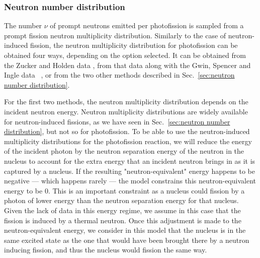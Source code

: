 \subsubsection*{Neutron number distribution}\label{sec:neutron number distribution for photofission}
The number $\nu$ of prompt neutrons emitted per photofission 
is sampled from a prompt fission neutron multiplicity distribution. 
Similarly to the case of neutron-induced fission, the neutron 
multiplicity distribution for photofission can be obtained four 
ways, depending on the option selected. It can be obtained from the
Zucker and Holden data \cite{Zucker and Holden 1986}
, from that data along with the 
Gwin, Spencer and Ingle data~\cite{Gwin 1984}
, or from the two other methods 
 described in 
Sec.~\ref{sec:neutron number distribution}.

For the first two methods, 
the neutron multiplicity distribution
depends on the incident neutron energy. Neutron multiplicity
distributions are widely available for neutron-induced fissions,
as we have seen in Sec.~\ref{sec:neutron number distribution}, but
not so for photofission. To be able to use the neutron-induced 
multiplicity distributions for the photofission reaction, we will 
reduce the energy of the incident photon by the neutron separation 
energy of the neutron in the nucleus to account for the extra 
energy that an incident neutron brings in as it is captured by a 
nucleus. If the resulting "neutron-equivalent" energy happens to 
be negative --- which happens rarely --- the model constrains this
neutron-equivalent energy to be 0. 
This is an important constraint as a nucleus could fission by a 
photon of lower energy than the neutron separation energy for that 
nucleus.  Given the lack of data in this energy regime, we assume 
in this case that the fission is induced by a thermal neutron. Once 
this adjustment is made to the neutron-equivalent energy, we 
consider in this model that the nucleus is in the same excited 
state as the one that would have been brought there by a neutron
inducing fission, and thus the nucleus would fission the same way.

